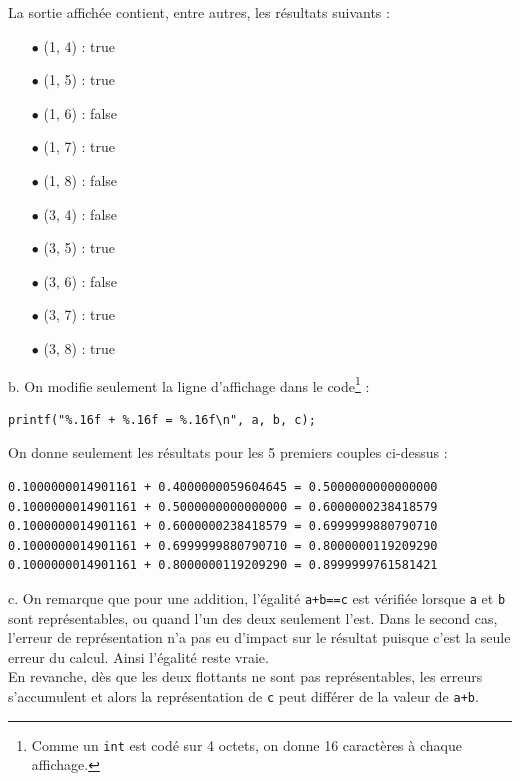 \documentclass[11pt, a4 paper]{article}
\begin{document}
La sortie affichée contient, entre autres, les résultats suivants :
\begin{multicols}{2}
    \begin{itemize}
        \item[$\bullet$] (1, 4) : true
        \item[$\bullet$] (1, 5) : true
        \item[$\bullet$] (1, 6) : false
        \item[$\bullet$] (1, 7) : true
        \item[$\bullet$] (1, 8) : false
        
        \item[$\bullet$] (3, 4) : false
        \item[$\bullet$] (3, 5) : true
        \item[$\bullet$] (3, 6) : false
        \item[$\bullet$] (3, 7) : true
        \item[$\bullet$] (3, 8) : true
    \end{itemize}    
\end{multicols}

b. On modifie seulement la ligne d'affichage dans le code\footnote{Comme un \texttt{int} est codé sur 4 octets, on donne 16 caractères à chaque affichage.} :
\begin{lstlisting}[style=CStyle]
printf("%.16f + %.16f = %.16f\n", a, b, c);
\end{lstlisting}
On donne seulement les résultats pour les 5 premiers couples ci-dessus :
\begin{lstlisting}[style=CStyle]
0.1000000014901161 + 0.4000000059604645 = 0.5000000000000000
0.1000000014901161 + 0.5000000000000000 = 0.6000000238418579
0.1000000014901161 + 0.6000000238418579 = 0.6999999880790710
0.1000000014901161 + 0.6999999880790710 = 0.8000000119209290
0.1000000014901161 + 0.8000000119209290 = 0.8999999761581421
\end{lstlisting}

c. On remarque que pour une addition, l'égalité \texttt{a+b==c} est vérifiée lorsque \texttt{a} et \texttt{b} sont représentables, ou quand l'un des deux seulement l'est.
Dans le second cas, l'erreur de représentation n'a pas eu d'impact sur le résultat puisque c'est la seule erreur du calcul.
Ainsi l'égalité reste vraie.\\
En revanche, dès que les deux flottants ne sont pas représentables, les erreurs s'accumulent et alors la représentation de \texttt{c} peut différer de la valeur de \texttt{a+b}.\\
\end{document}
